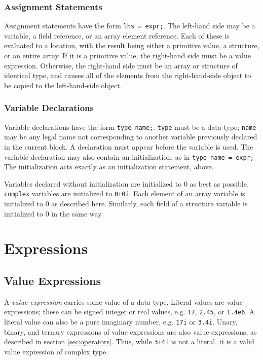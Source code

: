 \documentclass[11pt]{article}
\begin{document}
\subsubsection{Assignment Statements}

Assignment statements have the form \texttt{lhs = expr;}.  The left-hand
side may be a variable, a field reference, or an array element
reference.  Each of these is evaluated to a location, with the result
being either a primitive value, a structure, or an entire array.  If
it is a primitive value, the right-hand side must be a value
expression.  Otherwise, the right-hand side must be an array or
structure of identical type, and causes all of the elements from the
right-hand-side object to be copied to the left-hand-side object.

\subsubsection{Variable Declarations}

Variable declarations have the form \texttt{type name;}.  \texttt{type}
must be a data type; \texttt{name} may be any legal name not
corresponding to another variable previously declared in the current
block.  A declaration must appear before the variable is used.  The
variable declaration may also contain an initialization, as in
\texttt{type name = expr;}  The initialization acts exactly as an
initialization statement, above.

Variables declared without initialization are initialized to 0 as best
as possible.  \texttt{complex} variables are initialized to
\texttt{0+0i}.  Each element of an array variable is initialized to
0 as described here.  Similarly, each field of a structure variable is
initialized to 0 in the same way.


\section{Expressions}

\subsection{Value Expressions}
\label{sec:expr-value}

A \emph{value expression} carries some value of a data type.  Literal
values are value expressions; these can be signed integer or real
values, e.g. \texttt{17}, \texttt{2.45}, or \texttt{1.4e6}.  A literal value
can also be a pure imaginary number, e.g. \texttt{17i} or \texttt{3.4i}.
Unary, binary, and ternary expressions of value expressions are also
value expressions, as described in section \ref{sec:operators}.  Thus,
while \texttt{3+4i} is not a literal, it is a valid value expression of
complex type.
\end{document}
